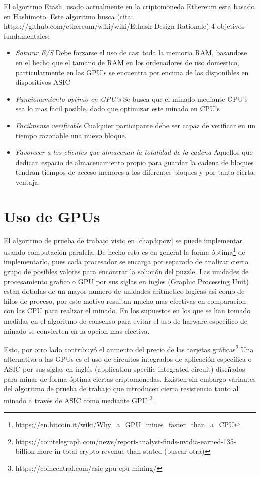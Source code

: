 El algoritmo Etash, usado actualmente en la criptomoneda Ethereum esta basado en Hashimoto. Este algoritmo busca (cita: https://github.com/ethereum/wiki/wiki/Ethash-Design-Rationale) 4 objetivos fundamentales:
\begin{itemize}
    \item \textit{Saturar E/S} Debe forzarse el uso de casi toda la memoria RAM, basandose en el hecho que el tamano de RAM en los ordenadores de uso domestico, particularmente en las GPU's se encuentra por encima de los disponibles en dispositivos ASIC
    \item \textit{Funcionamiento optimo en GPU's} Se busca que el minado mediante GPU's sea lo mas facil posible, dado que optimizar este minado en CPU's 
    \item \textit{Facilmente verificable} Cualquier participante debe ser capaz de verificar en un tiempo razonable una nuevo bloque.
    \item \textit{Favorecer a los clientes que almacenan la totalidad de la cadena} Aquellos que dedican espacio de almacenamiento propio para guardar la cadena de bloques tendran tiempos de acceso menores a los diferentes bloques y por tanto cierta ventaja.
\end{itemize}

\section{Uso de GPUs} %
El algoritmo de prueba de trabajo visto en \ref{chap3:pow} se puede implementar usando computación paralela. De hecho esta es en general la forma óptima\footnote{\url{https://en.bitcoin.it/wiki/Why_a_GPU_mines_faster_than_a_CPU}} de implementarlo, pues cada procesador se encarga por separado de analizar cierto grupo de posibles valores para encontrar la solución del puzzle. Las unidades de procesamiento grafico o GPU por sus siglas en ingles (Graphic Processing Unit) estan dotadas de un mayor numero de unidades aritmetico-logicas asi como de hilos de proceso, por este motivo resultan mucho mas efectivas en comparacion con las CPU para realizar el minado. En los supuestos en los que se han tomado medidas en el algoritmo de consenso para evitar el uso de harware especifico de minado se convierten en la opcion mas efectiva.


Esto, por otro lado contribuyó el aumento del precio de las tarjetas gráficas\footnote{https://cointelegraph.com/news/report-analyst-finds-nvidia-earned-135-billion-more-in-total-crypto-revenue-than-stated (buscar otra)}
Una alternativa a las GPUs es el uso de circuitos integrados de aplicación específica o ASIC por sus siglas en inglés (application-specific integrated circuit) diseñados para minar de forma óptima ciertas criptomonedas. Existen sin embargo variantes del algoritmo de prueba de trabajo que introducen cierta resistencia tanto al minado a través de ASIC como mediante GPU \footnote{https://coincentral.com/asic-gpu-cpu-mining/}

